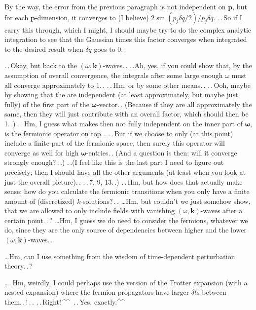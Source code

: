 \documentclass{report}
\begin{document}
By the way, the error from the previous paragraph is not independent on $\boldsymbol{p}$, but for each $\boldsymbol{p}$-dimension, it converges to (I believe) $2\sin(p_j \delta q / 2) / p_j \delta q$. .\,.\,So if I carry this through, which I might, I should maybe try to do the complex analytic integration to see that the Gaussian times this factor converges when integrated to the desired result when $\delta q$ goes to 0.\,. 

.\,.\,Okay, but back to the $(\omega, \boldsymbol{k})$-waves.\,. \ldots Ah, yes, if you could show that, by the assumption of overall convergence, the integrals after some large enough $\omega$ must all converge approximately to 1.\,. .\,.\,Hm, or by some other means.\,. .\,.\,Ooh, maybe by showing that the are independent (at least approximately, but maybe just fully) of the first part of the $\boldsymbol\omega$-vector.\,. (Because if they are all approximately the same, then they will just contribute with an overall factor, which should then be 1.\,.) .\,.\,Hm, I guess what makes then not fully independent on the inner part of $\boldsymbol\omega$, is the fermionic operator on top.\,. .\,.\,But if we choose to only (at this point) include a finite part of the fermionic space, then surely this operator will converge as well for high $\boldsymbol\omega$-entries.\,. (And a question is then: will it converge strongly enough?\,.\,.) %
.\,.(I feel like this is the last part I need to figure out precisely; then I should have all the other arguments (at least when you look at just the overall picture).\,. .\,.\,7, 9, 13.\,.) .\,.\,Hm, but how does that actually make sense; how do you calculate the fermionic transitions when you only have a finite amount of (discretized) $k$-solutions?\,.\,. \ldots Hm, but couldn't we just somehow show, that we are allowed to only include fields with vanishing $(\omega, \boldsymbol{k})$-waves after a certain point.\,.\,? 
\ldots Hm, I guess we do need to consider the fermions, whatever we do, since they are the only source of dependencies between higher and the lower $(\omega, \boldsymbol{k})$-waves.\,. %

\ldots Hm, can I use something from the wisdom of time-dependent perturbation theory.\,.\,? 

\ldots\ Hm, weirdly, I could perhaps use the version of the Trotter expansion (with a nested expansion) where the fermion propagators have larger $\delta t$s between them.\,.\,!\,.\,. .\,.\,Right!\,\textasciicircum\textasciicircum\ .\,.\,Yes, exactly.\textasciicircum\textasciicircum\ 
\end{document}
